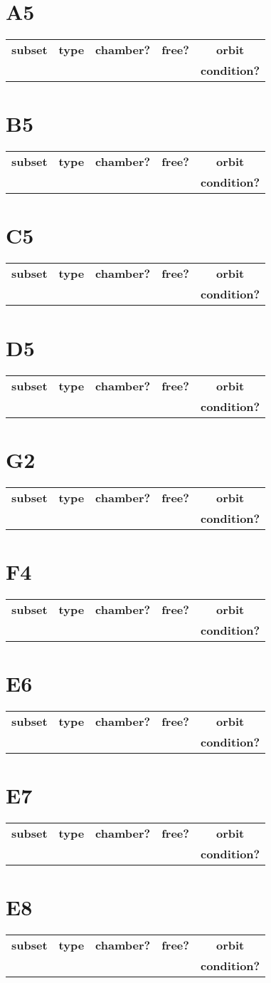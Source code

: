 \documentclass{article}
\newcommand{\resulttable}[1]{
  \section*{#1}
\begin{longtable}{llccc}
  \toprule
  \textbf{subset} & \textbf{type} & \textbf{chamber?} & \textbf{free?} & \textbf{orbit} \\
                  &               &                   &                & \textbf{condition?} \\
  \midrule
  
  \bottomrule
\end{longtable}
}
\begin{document}
\resulttable{A5}\newpage
\resulttable{B5}\newpage
\resulttable{C5}\newpage
\resulttable{D5}\newpage
\resulttable{G2}
\resulttable{F4}\newpage
\resulttable{E6}\newpage
\resulttable{E7}\newpage
\resulttable{E8}
\end{document}
